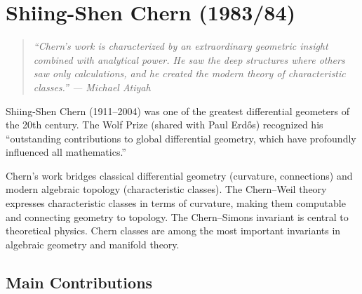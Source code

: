 \let\im\relax
\newcommand{\im}{\operatorname{im}}
\let\End\relax
\newcommand{\End}{\operatorname{End}}
\let\Ker\relax
\newcommand{\Ker}{\operatorname{Ker}}
\let\Pf\relax
\newcommand{\Pf}{\operatorname{Pf}}
\let\Td\relax
\newcommand{\Td}{\operatorname{Td}}
\let\N\relax
\newcommand{\N}{\mathbb{N}}
\let\R\relax
\newcommand{\R}{\mathbb{R}}
\let\C\relax
\newcommand{\C}{\mathbb{C}}
\let\Q\relax
\newcommand{\Q}{\mathbb{Q}}
\let\Z\relax
\newcommand{\Z}{\mathbb{Z}}
\let\cE\relax
\newcommand{\cE}{\mathcal{E}}

\chapter{Shiing-Shen Chern (1983/84)}

\begin{quote}
\it ``Chern's work is characterized by an extraordinary geometric insight combined with analytical power. He saw the deep structures where others saw only calculations, and he created the modern theory of characteristic classes.'' --- Michael Atiyah
\end{quote}

Shiing-Shen Chern (1911--2004) was one of the greatest differential geometers of the 20th century. The Wolf Prize (shared with Paul Erdős) recognized his ``outstanding contributions to global differential geometry, which have profoundly influenced all mathematics.''

Chern's work bridges classical differential geometry (curvature, connections) and modern algebraic topology (characteristic classes). The Chern--Weil theory expresses characteristic classes in terms of curvature, making them computable and connecting geometry to topology. The Chern--Simons invariant is central to theoretical physics. Chern classes are among the most important invariants in algebraic geometry and manifold theory.

\section{Main Contributions}

